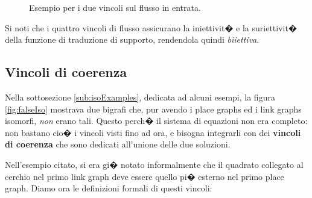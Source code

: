 \begin{itemize}
\begin{itemize}
\begin{figure*}[th]
	\caption{Esempio per i due vincoli sul flusso in entrata. \label{fig:inFlowLinkConstraint}}
	\end{figure*}
			
			\end{itemize}
\end{itemize}

Si noti che i quattro vincoli di flusso assicurano la iniettivit� e la suriettivit� della funzione di traduzione di supporto, rendendola quindi \emph{biiettiva}.


\subsection{Vincoli di coerenza}
Nella sottosezione \ref{sub:isoExamples}, dedicata ad alcuni esempi, la figura \ref{fig:falseIso} mostrava due bigrafi che, pur avendo i place graphs ed i link graphs isomorfi, \emph{non} erano tali. Questo perch� il sistema di equazioni non era completo: non bastano cio� i vincoli visti fino ad ora, e bisogna integrarli con dei \textbf{vincoli di coerenza} che sono dedicati all'unione delle due soluzioni.

Nell'esempio citato, si era gi� notato informalmente che il quadrato collegato al cerchio nel primo link graph deve essere quello pi� esterno nel primo place graph. Diamo ora le definizioni formali di questi vincoli:

